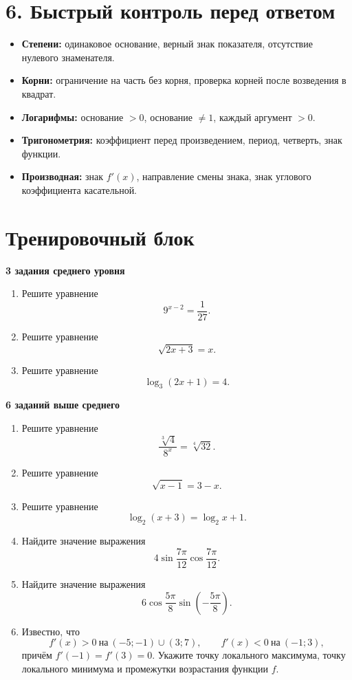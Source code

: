 \documentclass[a4paper,12pt]{article}
\newcommand{\key}[1]{\textcolor{darkaccent}{\textbf{#1}}}
\begin{document}
\section{6. Быстрый контроль перед ответом}

\begin{itemize}
  \item \key{Степени:} одинаковое основание, верный знак показателя, отсутствие нулевого знаменателя.
  \item \key{Корни:} ограничение на часть без корня, проверка корней после возведения в квадрат.
  \item \key{Логарифмы:} основание $>0$, основание $\ne1$, каждый аргумент $>0$.
  \item \key{Тригонометрия:} коэффициент перед произведением, период, четверть, знак функции.
  \item \key{Производная:} знак $f'(x)$, направление смены знака, знак углового коэффициента касательной.
\end{itemize}

\clearpage
\section{Тренировочный блок}

\textbf{3 задания среднего уровня}
\begin{enumerate}[label=\textbf{\arabic*.}]
  \item Решите уравнение
  \[
  9^{x-2}=\frac1{27}.
  \]

  \item Решите уравнение
  \[
  \sqrt{2x+3}=x.
  \]

  \item Решите уравнение
  \[
  \log_3(2x+1)=4.
  \]
\end{enumerate}

\textbf{6 заданий выше среднего}
\begin{enumerate}[label=\textbf{\arabic*.},start=4]
  \item Решите уравнение
  \[
  \frac{\sqrt[3]{4}}{8^x}=\sqrt[4]{32}.
  \]

  \item Решите уравнение
  \[
  \sqrt{x-1}=3-x.
  \]

  \item Решите уравнение
  \[
  \log_2(x+3)=\log_2 x+1.
  \]

  \item Найдите значение выражения
  \[
  4\sin\frac{7\pi}{12}\cos\frac{7\pi}{12}.
  \]

  \item Найдите значение выражения
  \[
  6\cos\frac{5\pi}{8}\sin\!\left(-\frac{5\pi}{8}\right).
  \]

  \item Известно, что
  \[
  f'(x)>0\ \text{на}\ (-5;-1)\cup(3;7),
  \qquad
  f'(x)<0\ \text{на}\ (-1;3),
  \]
  причём $f'(-1)=f'(3)=0$. Укажите точку локального максимума, точку локального минимума и промежутки возрастания функции $f$.
\end{enumerate}
\end{document}
